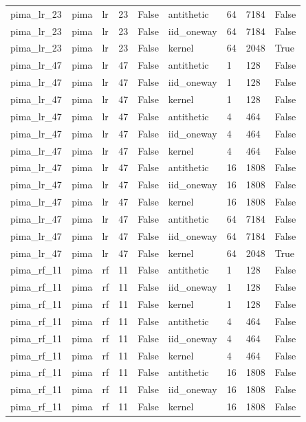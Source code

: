 \begin{tabular}{lllllllll}
pima\_lr\_23 & pima & lr & 23 & False & antithetic & 64 & 7184 & False \\
pima\_lr\_23 & pima & lr & 23 & False & iid\_oneway & 64 & 7184 & False \\
pima\_lr\_23 & pima & lr & 23 & False & kernel & 64 & 2048 & True \\
pima\_lr\_47 & pima & lr & 47 & False & antithetic & 1 & 128 & False \\
pima\_lr\_47 & pima & lr & 47 & False & iid\_oneway & 1 & 128 & False \\
pima\_lr\_47 & pima & lr & 47 & False & kernel & 1 & 128 & False \\
pima\_lr\_47 & pima & lr & 47 & False & antithetic & 4 & 464 & False \\
pima\_lr\_47 & pima & lr & 47 & False & iid\_oneway & 4 & 464 & False \\
pima\_lr\_47 & pima & lr & 47 & False & kernel & 4 & 464 & False \\
pima\_lr\_47 & pima & lr & 47 & False & antithetic & 16 & 1808 & False \\
pima\_lr\_47 & pima & lr & 47 & False & iid\_oneway & 16 & 1808 & False \\
pima\_lr\_47 & pima & lr & 47 & False & kernel & 16 & 1808 & False \\
pima\_lr\_47 & pima & lr & 47 & False & antithetic & 64 & 7184 & False \\
pima\_lr\_47 & pima & lr & 47 & False & iid\_oneway & 64 & 7184 & False \\
pima\_lr\_47 & pima & lr & 47 & False & kernel & 64 & 2048 & True \\
pima\_rf\_11 & pima & rf & 11 & False & antithetic & 1 & 128 & False \\
pima\_rf\_11 & pima & rf & 11 & False & iid\_oneway & 1 & 128 & False \\
pima\_rf\_11 & pima & rf & 11 & False & kernel & 1 & 128 & False \\
pima\_rf\_11 & pima & rf & 11 & False & antithetic & 4 & 464 & False \\
pima\_rf\_11 & pima & rf & 11 & False & iid\_oneway & 4 & 464 & False \\
pima\_rf\_11 & pima & rf & 11 & False & kernel & 4 & 464 & False \\
pima\_rf\_11 & pima & rf & 11 & False & antithetic & 16 & 1808 & False \\
pima\_rf\_11 & pima & rf & 11 & False & iid\_oneway & 16 & 1808 & False \\
pima\_rf\_11 & pima & rf & 11 & False & kernel & 16 & 1808 & False \\

\end{tabular}
